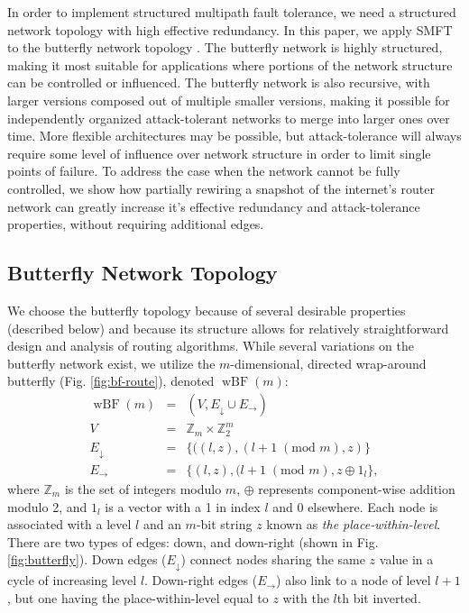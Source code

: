 \documentclass[10pt,letterpaper]{article}
\newcommand{\beq}{\begin{eqnarray}}
\newcommand{\eeq}{\end{eqnarray}}
\DeclareMathOperator{\wbf}{wBF}
\begin{document}
In order to implement structured multipath fault tolerance,
we need a structured network topology with high effective redundancy.
In this paper, we apply SMFT to the butterfly network topology
\cite{kshemkalyani_distributed_2008}.
The butterfly network is highly structured,
making it most suitable for applications where portions of the network structure
can be controlled or influenced.
The butterfly network is also recursive, with larger versions composed out of
multiple smaller versions,
making it possible for independently organized
attack-tolerant networks to merge into larger ones over time.
More flexible architectures may be possible,
but attack-tolerance will always require some level of influence over
network structure in order to limit single points of failure.
To address the case when the network cannot be fully controlled,
we show how partially rewiring a snapshot of the internet's router
network can greatly increase it's effective redundancy and
attack-tolerance properties, without requiring additional edges.

\subsection*{Butterfly Network Topology}

We choose the butterfly topology
\cite{kshemkalyani_distributed_2008}
because of several desirable properties (described below)
and because its structure allows for relatively straightforward
design and analysis of routing algorithms.
While several variations on the butterfly network exist,
we utilize the $m$-dimensional, directed wrap-around butterfly
(Fig. \ref{fig:bf-route}),
denoted $\wbf(m)$:
\beq
\wbf(m) &=& (V, E_\downarrow \cup E_\rightarrow) \\
V &=& \mathbb{Z}_{m} \times \mathbb{Z}_2^m \\
E_\downarrow
&=&
\{((l,z),(l+1 \; (\text{mod } m),z) \} \\
E_\rightarrow
&=&
\{(l,z),(l+1 \; (\text{mod } m),
z \oplus 1_l \},
\eeq
where $\mathbb{Z}_m$ is the set of integers modulo $m$,
$\oplus$ represents component-wise addition modulo 2,
and $1_l$ is a vector with a 1 in index $l$ and 0 elsewhere.
Each node is associated with a level $l$ and an $m$-bit string $z$
known as {\em the place-within-level}.
There are two types of edges: down, and down-right
(shown in Fig. \ref{fig:butterfly}).
Down edges ($E_\downarrow$) connect nodes sharing the same $z$ value
in a cycle of increasing level $l$.
Down-right edges ($E_\rightarrow$) also link to a node of level $l + 1$,
but one having the place-within-level equal to $z$ with the $l$th bit inverted.
\end{document}
